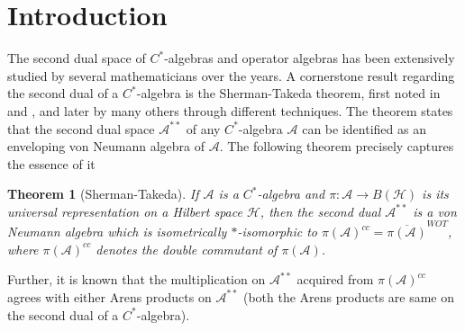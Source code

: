 \documentclass[10pt]{article}
\newtheorem{theorem}{Theorem}[section]
\theoremstyle{definition}
\begin{document}
	\section{Introduction}
	The second dual space of $C^*$-algebras and operator algebras has been extensively studied by several mathematicians over the years. A cornerstone result regarding the second dual of a $C^*$-algebra is the Sherman-Takeda theorem, first noted in \cite{Sherman} and \cite{Takeda}, and later by many others through different techniques. The theorem states that the second dual space $\mathcal A^{**}$ of any $C^*$-algebra $\mathcal A$ can be identified as an enveloping von Neumann algebra of $\mathcal A$. The following theorem precisely captures the essence of it
	\begin{theorem}[Sherman-Takeda]\label{STT}
		If $\mathcal A$ is a $C^*$-algebra and $\pi:\mathcal A\to B(\mathcal H)$ is its universal representation on a Hilbert space $\mathcal H$, then the second dual $\mathcal A^{**}$ is a von Neumann algebra which is isometrically $*$-isomorphic to $\pi(\mathcal A)^{cc}=\overline{\pi(\mathcal A)}^{WOT}$, where $\mathcal \pi(\mathcal A)^{cc}$ denotes the double commutant of $\pi(\mathcal A)$. 
	\end{theorem}
	\noindent	Further, it is known that the multiplication on $\mathcal A^{**}$ acquired from $\pi(\mathcal A)^{cc}$ agrees with either Arens products on $\mathcal A^{**}$ (both the Arens products are same on the second dual of a $C^*$-algebra). \\
	
\end{document}
